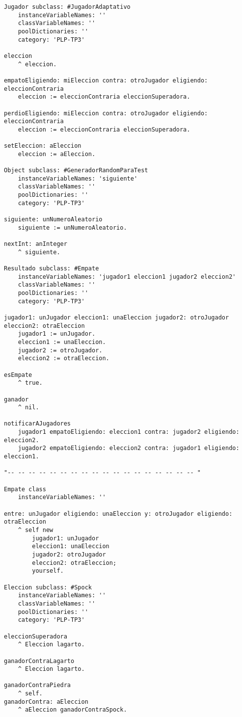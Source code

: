 \documentclass[10pt, a4paper,english,spanish,hidelinks]{article}
\begin{document}
\begin{verbatim}
Jugador subclass: #JugadorAdaptativo
	instanceVariableNames: ''
	classVariableNames: ''
	poolDictionaries: ''
	category: 'PLP-TP3'

eleccion
	^ eleccion. 

empatoEligiendo: miEleccion contra: otroJugador eligiendo: eleccionContraria 
	eleccion := eleccionContraria eleccionSuperadora.  

perdioEligiendo: miEleccion contra: otroJugador eligiendo: eleccionContraria 
	eleccion := eleccionContraria eleccionSuperadora.  

setEleccion: aEleccion 
	eleccion := aEleccion. 

Object subclass: #GeneradorRandomParaTest
	instanceVariableNames: 'siguiente'
	classVariableNames: ''
	poolDictionaries: ''
	category: 'PLP-TP3'

siguiente: unNumeroAleatorio
	siguiente := unNumeroAleatorio. 

nextInt: anInteger 
	^ siguiente. 

Resultado subclass: #Empate
	instanceVariableNames: 'jugador1 eleccion1 jugador2 eleccion2'
	classVariableNames: ''
	poolDictionaries: ''
	category: 'PLP-TP3'

jugador1: unJugador eleccion1: unaEleccion jugador2: otroJugador eleccion2: otraEleccion 
	jugador1 := unJugador.
	eleccion1 := unaEleccion.
	jugador2 := otroJugador.
	eleccion2 := otraEleccion. 

esEmpate
	^ true. 

ganador
	^ nil. 

notificarAJugadores
	jugador1 empatoEligiendo: eleccion1 contra: jugador2 eligiendo: eleccion2. 
	jugador2 empatoEligiendo: eleccion2 contra: jugador1 eligiendo: eleccion1. 

"-- -- -- -- -- -- -- -- -- -- -- -- -- -- -- -- -- -- "

Empate class
	instanceVariableNames: ''

entre: unJugador eligiendo: unaEleccion y: otroJugador eligiendo: otraEleccion 
	^ self new
		jugador1: unJugador
		eleccion1: unaEleccion
		jugador2: otroJugador
		eleccion2: otraEleccion;
		yourself. 

Eleccion subclass: #Spock
	instanceVariableNames: ''
	classVariableNames: ''
	poolDictionaries: ''
	category: 'PLP-TP3'

eleccionSuperadora
	^ Eleccion lagarto. 

ganadorContraLagarto
	^ Eleccion lagarto. 

ganadorContraPiedra
	^ self. 
ganadorContra: aEleccion 
	^ aEleccion ganadorContraSpock. 


\end{verbatim}
\end{document}
